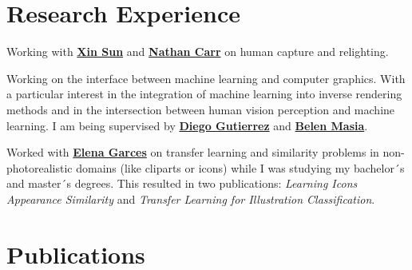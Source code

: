 \documentclass[]{resume}
\begin{document}
\begin{minipage}[t]{0.66\textwidth} 


\section{Research Experience}

Working with \textbf{\href{http://sunxin.name/}{Xin Sun}} and \href{https://research.adobe.com/person/nathan-carr/}{\textbf{Nathan Carr}} on human capture and relighting.
\sectionsep

Working on the interface between machine learning and computer graphics. With a particular interest in the integration of machine learning into inverse rendering methods and in the intersection between human vision perception and machine learning. I am being supervised by \href{http://giga.cps.unizar.es/~diegog/}{\textbf{Diego Gutierrez}} and \href{http://webdiis.unizar.es/~bmasia/}{\textbf{Belen Masia}}.
\sectionsep

Worked with \textbf{\href{http://www.elenagarces.es/}{Elena Garces}} on transfer learning and similarity problems in non-photorealistic domains (like cliparts or icons) while I was studying my bachelor´s and master´s degrees. This resulted in two publications: \textit{Learning Icons Appearance Similarity} and \textit{Transfer Learning for Illustration Classification}.
\sectionsep




\section{Publications}
\nocite{*}
\printbibliography[heading=none]


\end{minipage}
\end{document}
